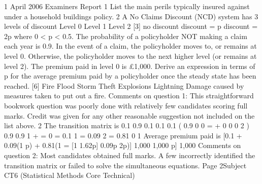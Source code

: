 
1
April 2006
Examiners Report                   
1 List the main perils typically insured against under a household buildings policy.
2 A No Claims Discount (NCD) system has 3 levels of discount
Level 0
Level 1
Level 2
[3]
no discount
discount = p
discount = 2p
where 0 < p < 0.5.
The probability of a policyholder NOT making a claim each year is 0.9.
In the event of a claim, the policyholder moves to, or remains at level 0. Otherwise,
the policyholder moves to the next higher level (or remains at level 2).
The premium paid in level 0 is £1,000.
Derive an expression in terms of p for the average premium paid by a policyholder
once the steady state has been reached.
[6]
Fire
Flood
Storm
Theft
Explosions
Lightning
Damage caused by measures taken to put out a fire.
Comments on question 1: This straightforward bookwork question was poorly done with
relatively few candidates scoring full marks. Credit was given for any other reasonable
suggestion not included on the list above.
2
The transition matrix is
0.1 0.9
0.1
0.1
0.1 (
0.9
0
0
=
+
0
0
0
2 )
0.9
0.9
1 +
=
0 = 0.1
1 = 0.09
2 = 0.81
0
1
Average premium paid is
[0.1 + 0.09(1 p) + 0.81(1
= [1 1.62p]
0.09p
2p)]
1,000
1,000
p]
1,000
Comments on question 2: Most candidates obtained full marks. A few incorrectly identified
the transition matrix or failed to solve the simultaneous equations.
Page 2Subject CT6 (Statistical Methods Core Technical)
